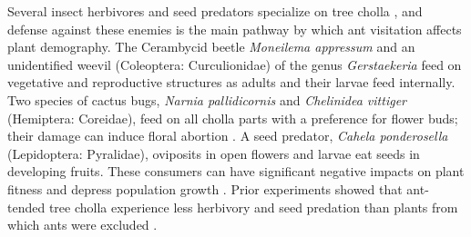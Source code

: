 \documentclass[11pt]{article}
\begin{document}
Several insect herbivores and seed predators specialize on tree cholla \citep{Mann1969}, and defense against these enemies is the main pathway by which ant visitation affects plant demography. 
The Cerambycid beetle \textit{Moneilema appressum} and an unidentified weevil (Coleoptera: Curculionidae) of the genus \textit{Gerstaekeria} feed on vegetative and reproductive structures as adults and their larvae feed internally. 
Two species of cactus bugs, \textit{Narnia pallidicornis} and \textit{Chelinidea vittiger} (Hemiptera: Coreidae), feed on all cholla parts with a preference for flower buds; their damage can induce floral abortion \citep{Miller2006}. 
A seed predator, \textit{Cahela ponderosella} (Lepidoptera: Pyralidae), oviposits in open flowers and larvae eat seeds in developing fruits. 
These consumers can have significant negative impacts on plant fitness and depress population growth \citep{Miller2009}.
Prior experiments showed that ant-tended tree cholla experience less herbivory and seed predation than plants from which ants were excluded \citep{Miller2007,Ohm2014}. 
\end{document}
